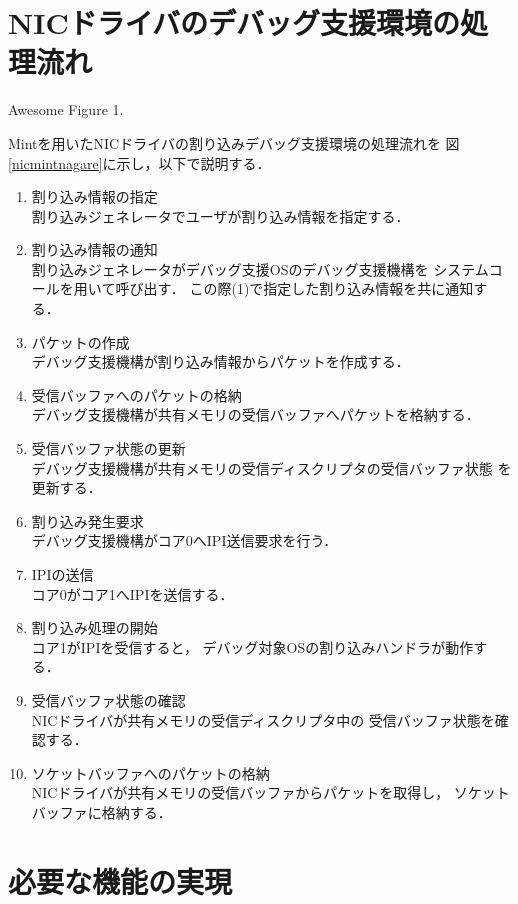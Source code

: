 \documentclass[tanilab-enum]{graduate}
\begin{document}
\section{NICドライバのデバッグ支援環境の処理流れ}
{Awesome Figure 1.}

Mintを用いたNICドライバの割り込みデバッグ支援環境の処理流れを
図\ref{nicmintnagare}に示し，以下で説明する．
\begin{enumerate}
    \item 割り込み情報の指定\\
        割り込みジェネレータでユーザが割り込み情報を指定する．
    \item 割り込み情報の通知\\
        割り込みジェネレータがデバッグ支援OSのデバッグ支援機構を
        システムコールを用いて呼び出す．
        この際(1)で指定した割り込み情報を共に通知する．
    \item パケットの作成\\
        デバッグ支援機構が割り込み情報からパケットを作成する．
    \item 受信バッファへのパケットの格納\\
        デバッグ支援機構が共有メモリの受信バッファへパケットを格納する．
    \item 受信バッファ状態の更新\\
        デバッグ支援機構が共有メモリの受信ディスクリプタの受信バッファ状態
        を更新する．
    \item 割り込み発生要求\\
        デバッグ支援機構がコア0へIPI送信要求を行う．
    \item IPIの送信\\
        コア0がコア1へIPIを送信する．
    \item 割り込み処理の開始\\
        コア1がIPIを受信すると，
        デバッグ対象OSの割り込みハンドラが動作する．
    \item 受信バッファ状態の確認\\
        NICドライバが共有メモリの受信ディスクリプタ中の
        受信バッファ状態を確認する．
    \item ソケットバッファへのパケットの格納\\
        NICドライバが共有メモリの受信バッファからパケットを取得し，
        ソケットバッファに格納する．
\end{enumerate}

\section{必要な機能の実現}
\end{document}
